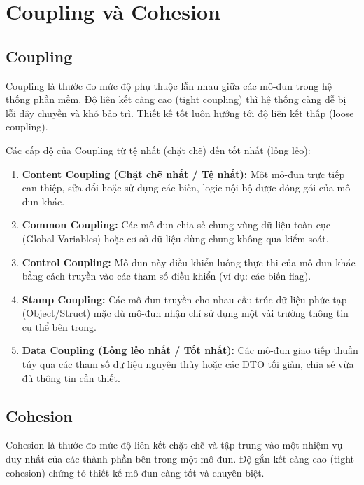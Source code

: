 \documentclass[12pt,a4paper]{article}
\begin{document}
\section{Coupling và Cohesion}

\subsection{Coupling}
Coupling là thước đo mức độ phụ thuộc lẫn nhau giữa các mô-đun trong hệ thống phần mềm. Độ liên kết càng cao (tight coupling) thì hệ thống càng dễ bị lỗi dây chuyền và khó bảo trì. Thiết kế tốt luôn hướng tới độ liên kết thấp (loose coupling).

Các cấp độ của Coupling từ tệ nhất (chặt chẽ) đến tốt nhất (lỏng lẻo):
\begin{enumerate}
    \item \textbf{Content Coupling (Chặt chẽ nhất / Tệ nhất):} Một mô-đun trực tiếp can thiệp, sửa đổi hoặc sử dụng các biến, logic nội bộ được đóng gói của mô-đun khác.
    \item \textbf{Common Coupling:} Các mô-đun chia sẻ chung vùng dữ liệu toàn cục (Global Variables) hoặc cơ sở dữ liệu dùng chung không qua kiểm soát.
    \item \textbf{Control Coupling:} Mô-đun này điều khiển luồng thực thi của mô-đun khác bằng cách truyền vào các tham số điều khiển (ví dụ: các biến flag).
    \item \textbf{Stamp Coupling:} Các mô-đun truyền cho nhau cấu trúc dữ liệu phức tạp (Object/Struct) mặc dù mô-đun nhận chỉ sử dụng một vài trường thông tin cụ thể bên trong.
    \item \textbf{Data Coupling (Lỏng lẻo nhất / Tốt nhất):} Các mô-đun giao tiếp thuần túy qua các tham số dữ liệu nguyên thủy hoặc các DTO tối giản, chia sẻ vừa đủ thông tin cần thiết.
\end{enumerate}

\subsection{Cohesion}
Cohesion là thước đo mức độ liên kết chặt chẽ và tập trung vào một nhiệm vụ duy nhất của các thành phần bên trong một mô-đun. Độ gắn kết càng cao (tight cohesion) chứng tỏ thiết kế mô-đun càng tốt và chuyên biệt.
\end{document}
